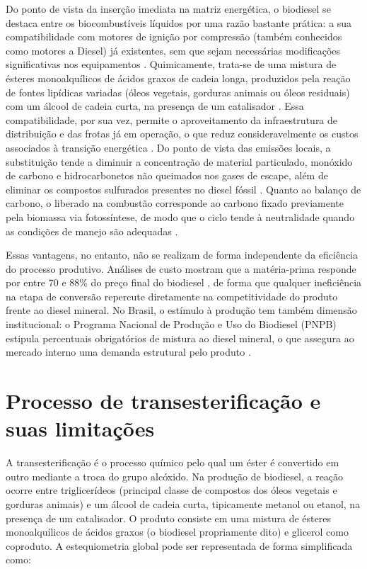 Do ponto de vista da inserção imediata na matriz energética, o biodiesel se destaca entre os biocombustíveis líquidos por uma razão bastante prática: a sua compatibilidade com motores de ignição por compressão (também conhecidos como motores a Diesel) já existentes, sem que sejam necessárias modificações significativas nos equipamentos \cite{leung2010}. Quimicamente, trata-se de uma mistura de ésteres monoalquílicos de ácidos graxos de cadeia longa, produzidos pela reação de fontes lipídicas variadas (óleos vegetais, gorduras animais ou óleos residuais) com um álcool de cadeia curta, na presença de um catalisador \cite{dabdoub2009}. Essa compatibilidade, por sua vez, permite o aproveitamento da infraestrutura de distribuição e das frotas já em operação, o que reduz consideravelmente os custos associados à transição energética \cite{dabdoub2009}. Do ponto de vista das emissões locais, a substituição tende a diminuir a concentração de material particulado, monóxido de carbono e hidrocarbonetos não queimados nos gases de escape, além de eliminar os compostos sulfurados presentes no diesel fóssil \cite{encinar2016,verma2016}. Quanto ao balanço de carbono, o  liberado na combustão corresponde ao carbono fixado previamente pela biomassa via fotossíntese, de modo que o ciclo tende à neutralidade quando as condições de manejo são adequadas \cite{ipcc2023}.

Essas vantagens, no entanto, não se realizam de forma independente da eficiência do processo produtivo. Análises de custo mostram que a matéria-prima responde por entre 70 e 88\% do preço final do biodiesel \cite{dabdoub2009}, de forma que qualquer ineficiência na etapa de conversão repercute diretamente na competitividade do produto frente ao diesel mineral. No Brasil, o estímulo à produção tem também dimensão institucional: o Programa Nacional de Produção e Uso do Biodiesel (PNPB) estipula percentuais obrigatórios de mistura ao diesel mineral, o que assegura ao mercado interno uma demanda estrutural pelo produto \cite{brasilpnpb2004}.

\section{Processo de transesterificação e suas limitações}

A transesterificação é o processo químico pelo qual um éster é convertido em outro mediante a troca do grupo alcóxido. Na produção de biodiesel, a reação ocorre entre triglicerídeos (principal classe de compostos dos óleos vegetais e gorduras animais) e um álcool de cadeia curta, tipicamente metanol ou etanol, na presença de um catalisador. O produto consiste em uma mistura de ésteres monoalquílicos de ácidos graxos (o biodiesel propriamente dito) e glicerol como coproduto\cite{dabdoub2009,verma2016}. A estequiometria global pode ser representada de forma simplificada como:

